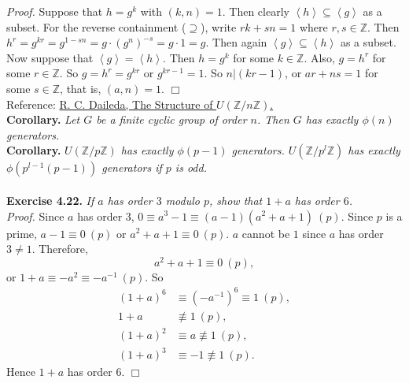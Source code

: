 \documentclass{article}
\begin{document}
\emph{Proof.}
Suppose that $h = g^k$ with $(k, n) = 1$.
Then clearly $\left \langle h \right \rangle \subseteq \left \langle g \right \rangle$
as a subset. For the reverse containment ($\supseteq$),
write $rk + sn = 1$ where $r, s \in \mathbb{Z}$. Then
$h^r = g^{kr} = g^{1 - sn} = g \cdot (g^n)^{-s} = g \cdot 1 = g$. Then again
$\left \langle g \right \rangle \subseteq \left \langle h \right \rangle$ as a subset. \\

Now suppose that $\left \langle g \right \rangle = \left \langle h \right \rangle$.
Then $h = g^k$ for some $k \in \mathbb{Z}$. Also, $g = h^r$ for some $r \in \mathbb{Z}$.
So $g = h^r = g^{kr}$ or $g^{kr - 1} = 1$. So $n | (kr - 1)$, or
$ar + ns = 1$ for some $s \in \mathbb{Z}$, that is, $(a, n) = 1$.
$\Box$ \\

Reference:
\href{http://ramanujan.math.trinity.edu/rdaileda/teach/s18/m3341/ZnZ.pdf}
{R. C. Daileda, The Structure of $U(\mathbb{Z}/n\mathbb{Z})$.} \\

\textbf{Corollary.}
\emph{Let $G$ be a finite cyclic group of order $n$.
Then $G$ has exactly $\phi(n)$ generators.} \\

\textbf{Corollary.}
\emph{$U(\mathbb{Z}/p\mathbb{Z})$ has exactly $\phi(p - 1)$ generators.
$U(\mathbb{Z}/p^l\mathbb{Z})$ has exactly $\phi(p^{l-1}(p - 1))$ generators if $p$ is odd.} \\\\



\textbf{Exercise 4.22.}
\emph{If $a$ has order $3$ modulo $p$, show that $1 + a$ has order $6$.} \\

\emph{Proof.}
Since $a$ has order $3$, $0 \equiv a^3 - 1 \equiv (a - 1)(a^2 + a + 1) \: (p)$.
Since $p$ is a prime, $a - 1 \equiv 0 \: (p)$ or $a^2 + a + 1 \equiv 0 \: (p)$.
$a$ cannot be $1$ since $a$ has order $3 \neq 1$.
Therefore,
$$a^2 + a + 1 \equiv 0 \: (p),$$
or
$1 + a \equiv -a^2 \equiv -a^{-1} \: (p)$.
So
\begin{align*}
(1 + a)^6 &\equiv (-a^{-1})^6 \equiv 1 \: (p), \\
1 + a     &\not\equiv 1 \: (p), \\
(1 + a)^2 &\equiv a \not\equiv 1 \: (p), \\
(1 + a)^3 &\equiv -1 \not\equiv 1 \: (p).
\end{align*}
Hence $1 + a$ has order $6$.
$\Box$ \\\\
\end{document}
